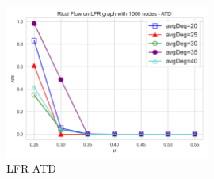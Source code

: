 \begin{figure}
    \centering
    \includegraphics[width=0.6\textwidth]{../tests/LFRResults/LFR_ATD.png}
    \caption{LFR ATD}
\end{figure}\label{fig:LFR_ATD}